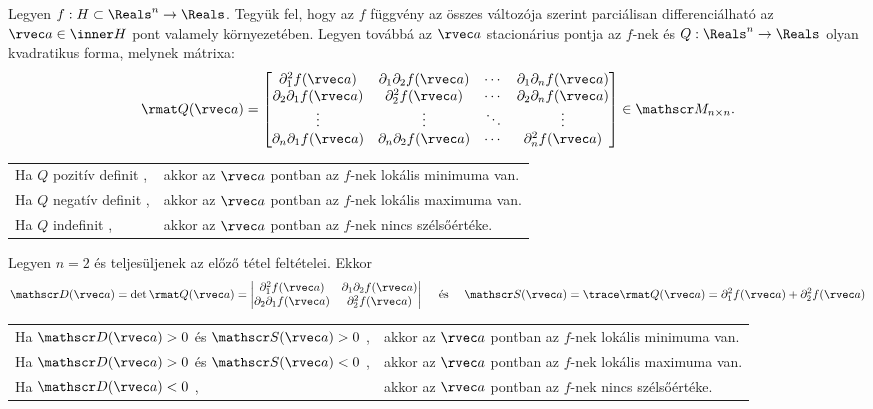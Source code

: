 \begin{theorem}
  Legyen $f: H \subset \Reals^n \to \Reals$. Tegyük fel, hogy az $f$ függvény
  az összes változója szerint parciálisan differenciálható az
  $\rvec a \in \inner H$ pont valamely környezetében. Legyen továbbá az
  $\rvec a$ stacionárius pontja az $f$-nek és $Q: \Reals^n \to \Reals$ olyan
  kvadratikus forma, melynek mátrixa:
  \def\arraystretch{1.5}
  $$
    \rmat Q(\rvec a) = \begin{bmatrix}
      \partial_1^2 f(\rvec a)          & \partial_1 \partial_2 f(\rvec a) & \cdots & \partial_1 \partial_n f(\rvec a) \\
      \partial_2 \partial_1 f(\rvec a) & \partial_2^2 f(\rvec a)          & \cdots & \partial_2 \partial_n f(\rvec a) \\
      \vdots                           & \vdots                           & \ddots & \vdots                           \\
      \partial_n \partial_1 f(\rvec a) & \partial_n \partial_2 f(\rvec a) & \cdots & \partial_n^2 f(\rvec a)
    \end{bmatrix}
    \in \mathscr M_{n \times n}
    \text.
  $$

  \def\arraystretch{1.33}
  \setlength{\tabcolsep}{0pt}
  \begin{tabular}{>{\bullet\;}l<{,\;}l}
    Ha $Q$ pozitív definit & akkor az $\rvec a$ pontban az $f$-nek lokális minimuma van. \\
    Ha $Q$ negatív definit & akkor az $\rvec a$ pontban az $f$-nek lokális maximuma van. \\
    Ha $Q$ indefinit       & akkor az $\rvec a$ pontban az $f$-nek nincs szélsőértéke.   \\
  \end{tabular}
\end{theorem}

\begin{theorem}
  Legyen $n = 2$ és teljesüljenek az előző tétel feltételei. Ekkor
  $$
    \mathscr D(\rvec a)
    = \det \rmat Q(\rvec a)
    = \begin{vmatrix}
      \partial_1^2 f(\rvec a)          & \partial_1 \partial_2 f(\rvec a) \\
      \partial_2 \partial_1 f(\rvec a) & \partial_2^2 f(\rvec a)
    \end{vmatrix}
    \quad\text{ és }\quad
    \mathscr S(\rvec a)
    = \trace \rmat Q(\rvec a)
    = \partial_1^2 f(\rvec a) + \partial_2^2 f(\rvec a)
  $$

  \def\arraystretch{1.33}
  \setlength{\tabcolsep}{0pt}
  \begin{tabular}{>{\bullet\;}l<{,\;}l}
    Ha $\mathscr D(\rvec a) > 0$ és $\mathscr S(\rvec a) > 0$ & akkor az $\rvec a$ pontban az $f$-nek lokális minimuma van. \\
    Ha $\mathscr D(\rvec a) > 0$ és $\mathscr S(\rvec a) < 0$ & akkor az $\rvec a$ pontban az $f$-nek lokális maximuma van. \\
    Ha $\mathscr D(\rvec a) < 0$                              & akkor az $\rvec a$ pontban az $f$-nek nincs szélsőértéke.   \\
  \end{tabular}
\end{theorem}

